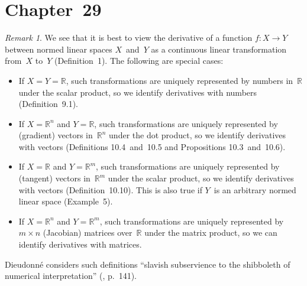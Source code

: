\documentclass[letterpaper,12pt]{article}
\newcommand{\R}{\mathbb{R}}
\theoremstyle{plain}
\theoremstyle{definition}
\theoremstyle{remark}
\newtheorem*{rmk}{Remark}
\begin{document}
\section*{Chapter~29}
\begin{rmk}
We see that it is best to view the derivative of a function \(f:X\to Y\) between normed linear spaces \(X\)~and~\(Y\) as a continuous linear transformation from~\(X\) to~\(Y\) (Definition~1). The following are special cases:
\begin{itemize}
\item If \(X=Y=\R\), such transformations are uniquely represented by numbers in~\(\R\) under the scalar product, so we identify derivatives with numbers (Definition~9.1).
\item If \(X=\R^n\) and \(Y=\R\), such transformations are uniquely represented by (gradient) vectors in~\(\R^n\) under the dot product, so we identify derivatives with vectors (Definitions 10.4~and~10.5 and Propositions 10.3~and~10.6).
\item If \(X=\R\) and \(Y=\R^m\), such transformations are uniquely represented by (tangent) vectors in~\(\R^m\) under the scalar product, so we identify derivatives with vectors (Definition~10.10). This is also true if \(Y\)~is an arbitrary normed linear space (Example~5).
\item If \(X=\R^n\) and \(Y=\R^m\), such transformations are uniquely represented by \(m\times n\) (Jacobian) matrices over~\(\R\) under the matrix product, so we can identify derivatives with matrices.
\end{itemize}
Dieudonn\'e considers such definitions ``slavish subservience to the shibboleth of numerical interpretation'' (\cite{dieudonne}, p.~141).
\end{rmk}
\end{document}
